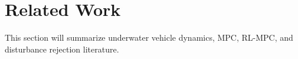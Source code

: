 \section{Related Work}

This section will summarize underwater vehicle dynamics, MPC, RL-MPC, and disturbance rejection literature.
